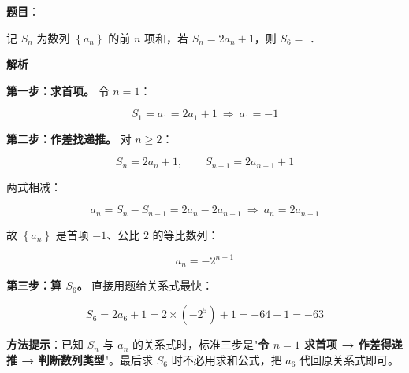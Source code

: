 \begin{answer}

\textbf{题目}：

记 $S_n$ 为数列 $\left\{a_n\right\}$ 的前 $n$ 项和，若 $S_n=2a_n+1$，则 $S_6=$ \gkblank{}．

\textbf{解析}

\textbf{第一步：求首项。} 令 $n=1$：

\nopagebreak[4]
\[S_1=a_1=2a_1+1\ \Longrightarrow\ a_1=-1\]

\textbf{第二步：作差找递推。} 对 $n\ge2$：

\nopagebreak[4]
\[S_n=2a_n+1,\qquad S_{n-1}=2a_{n-1}+1\]

两式相减：

\nopagebreak[4]
\[a_n=S_n-S_{n-1}=2a_n-2a_{n-1}\ \Longrightarrow\ a_n=2a_{n-1}\]

故 $\left\{a_n\right\}$ 是首项 $-1$、公比 $2$ 的等比数列：

\nopagebreak[4]
\[a_n=-2^{n-1}\]

\textbf{第三步：算 $S_6$。} 直接用题给关系式最快：

\nopagebreak[4]
\[S_6=2a_6+1=2\times\left(-2^{5}\right)+1=-64+1=-63\]

\begin{gktip}
\textbf{方法提示}：已知 $S_n$ 与 $a_n$ 的关系式时，标准三步是"\textbf{令 $n=1$ 求首项 → 作差得递推 → 判断数列类型}"。最后求 $S_6$ 时不必用求和公式，把 $a_6$ 代回原关系式即可。
\end{gktip}


\par\medskip

\end{answer}
